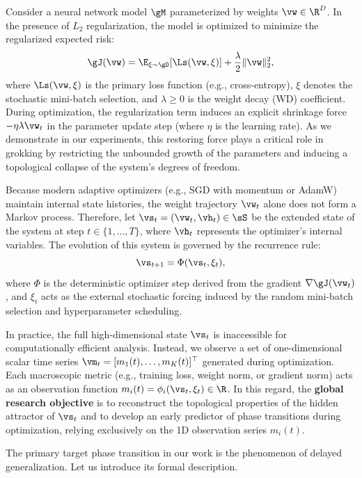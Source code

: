 \documentclass{article}
\begin{document}
Consider a neural network model $\gM$ parameterized by weights $\vw \in \R^D$. In the presence of $L_2$ regularization, the model is optimized to minimize the regularized expected risk:
\begin{equation}
    \gJ(\vw) = \E_{\xi \sim \gD}[\Ls(\vw, \xi)] + \frac{\lambda}{2} \|\vw\|_2^2,
\end{equation}
where $\Ls(\vw, \xi)$ is the primary loss function (e.g., cross-entropy), $\xi$ denotes the stochastic mini-batch selection, and $\lambda \ge 0$ is the weight decay (WD) coefficient. During optimization, the regularization term induces an explicit shrinkage force $-\eta \lambda \vw_t$ in the parameter update step (where $\eta$ is the learning rate). As we demonstrate in our experiments, this restoring force plays a critical role in grokking by restricting the unbounded growth of the parameters and inducing a topological collapse of the system's degrees of freedom.

Because modern adaptive optimizers (e.g., SGD with momentum or AdamW) maintain internal state histories, the weight trajectory $\vw_t$ alone does not form a Markov process. Therefore, let $\vs_t = (\vw_t, \vh_t) \in \sS$ be the extended state of the system at step $t \in \{1, \dots, T\}$, where $\vh_t$ represents the optimizer's internal variables. The evolution of this system is governed by the recurrence rule:
\begin{equation}
    \vs_{t+1} = \Phi(\vs_t, \xi_t),
\end{equation}
where $\Phi$ is the deterministic optimizer step derived from the gradient $\nabla \gJ(\vw_t)$, and $\xi_t$ acts as the external stochastic forcing induced by the random mini-batch selection and hyperparameter scheduling.

In practice, the full high-dimensional state $\vs_t$ is inaccessible for computationally efficient analysis. Instead, we observe a set of one-dimensional scalar time series $\vm_t =[m_1(t), \dots, m_K(t)]^\top$ generated during optimization. Each macroscopic metric (e.g., training loss, weight norm, or gradient norm) acts as an observation function $m_i(t) = \phi_i(\vs_t, \xi_t) \in \R$. In this regard, the \textbf{global research objective} is to reconstruct the topological properties of the hidden attractor of $\vs_t$ and to develop an early predictor of phase transitions during optimization, relying exclusively on the 1D observation series $m_i(t)$.

The primary target phase transition in our work is the phenomenon of delayed generalization. Let us introduce its formal description.
\end{document}
